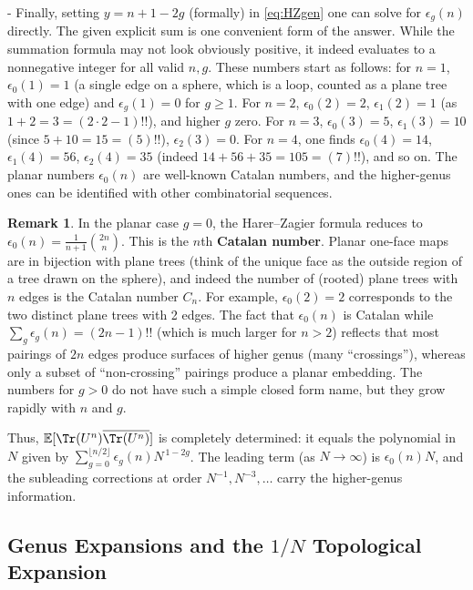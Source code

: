\documentclass[letterpaper,11pt,oneside,reqno]{article}
\numberwithin{equation}{section}
\theoremstyle{definition}
\newtheorem{remark}[proposition]{Remark}
\begin{document}
- Finally, setting $y= n+1-2g$ (formally) in \eqref{eq:HZgen} one can solve for $\epsilon_g(n)$ directly. The given explicit sum is one convenient form of the answer. While the summation formula may not look obviously positive, it indeed evaluates to a nonnegative integer for all valid $n,g$. These numbers start as follows: for $n=1$, $\epsilon_0(1)=1$ (a single edge on a sphere, which is a loop, counted as a plane tree with one edge) and $\epsilon_g(1)=0$ for $g\ge 1$. For $n=2$, $\epsilon_0(2)=2$, $\epsilon_1(2)=1$ (as $1+2=3=(2\cdot2-1)!!$), and higher $g$ zero. For $n=3$, $\epsilon_0(3)=5$, $\epsilon_1(3)=10$ (since $5+10=15=(5)!!$), $\epsilon_2(3)=0$. For $n=4$, one finds $\epsilon_0(4)=14$, $\epsilon_1(4)=56$, $\epsilon_2(4)=35$ (indeed $14+56+35=105=(7)!!$), and so on. The planar numbers $\epsilon_0(n)$ are well-known Catalan numbers, and the higher-genus ones can be identified with other combinatorial sequences.

\begin{remark}
In the planar case $g=0$, the Harer–Zagier formula reduces to $\epsilon_0(n) = \frac{1}{n+1}\binom{2n}{n}$. This is the $n$th \textbf{Catalan number}. Planar one-face maps are in bijection with plane trees (think of the unique face as the outside region of a tree drawn on the sphere), and indeed the number of (rooted) plane trees with $n$ edges is the Catalan number $C_n$. For example, $\epsilon_0(2)=2$ corresponds to the two distinct plane trees with 2 edges. The fact that $\epsilon_0(n)$ is Catalan while $\sum_g \epsilon_g(n)=(2n-1)!!$ (which is much larger for $n>2$) reflects that most pairings of $2n$ edges produce surfaces of higher genus (many ``crossings''), whereas only a subset of ``non-crossing'' pairings produce a planar embedding. The numbers for $g>0$ do not have such a simple closed form name, but they grow rapidly with $n$ and $g$.
\end{remark}

Thus, $\mathbb{E}[\Tr(U^n)\overline{\Tr(U^n)}]$ is completely determined: it equals the polynomial in $N$ given by $\sum_{g=0}^{\lfloor n/2\rfloor}\epsilon_g(n) N^{\,1-2g}$. The leading term (as $N\to\infty$) is $\epsilon_0(n)N$, and the subleading corrections at order $N^{-1}, N^{-3},\dots$ carry the higher-genus information.

\subsection*{Genus Expansions and the $1/N$ Topological Expansion}
\end{document}
